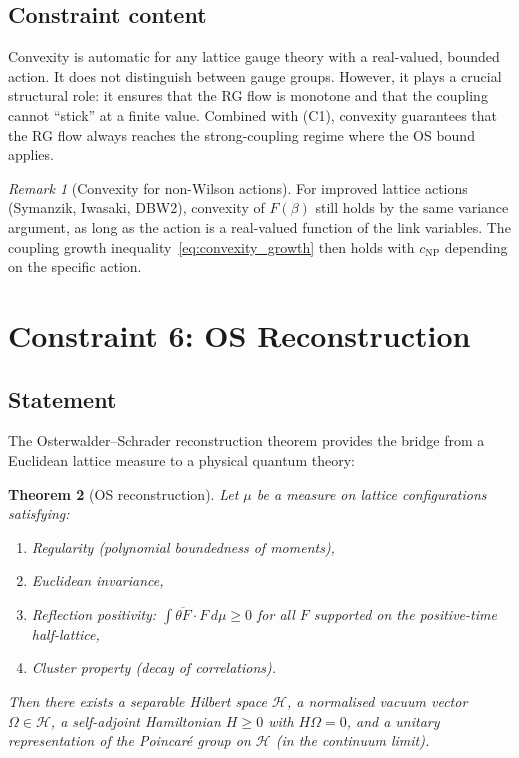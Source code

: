 \documentclass[12pt]{article}
\newtheorem{theorem}{Theorem}[section]
\theoremstyle{definition}
\theoremstyle{remark}
\newtheorem{remark}[theorem]{Remark}
\begin{document}
\subsection{Constraint content}

Convexity is automatic for any lattice gauge theory with a
real-valued, bounded action.  It does not distinguish between
gauge groups.  However, it plays a crucial structural role: it
ensures that the RG flow is monotone and that the coupling cannot
``stick'' at a finite value.  Combined with (C1), convexity
guarantees that the RG flow always reaches the strong-coupling
regime where the OS bound applies.

\begin{remark}[Convexity for non-Wilson actions]
For improved lattice actions (Symanzik, Iwasaki, DBW2), convexity
of $F(\beta)$ still holds by the same variance argument, as long
as the action is a real-valued function of the link variables.
The coupling growth inequality~\eqref{eq:convexity_growth} then
holds with $c_{\mathrm{NP}}$ depending on the specific action.
\end{remark}

\section{Constraint 6: OS Reconstruction}
\label{sec:OS}

\subsection{Statement}

The Osterwalder--Schrader reconstruction theorem
\cite{OS73,OS75} provides the bridge from a Euclidean lattice
measure to a physical quantum theory:

\begin{theorem}[OS reconstruction]
\label{thm:OS}
Let $\mu$ be a measure on lattice configurations satisfying:
\begin{enumerate}[label=\textup{(OS\arabic*)}]
\item Regularity (polynomial boundedness of moments),
\item Euclidean invariance,
\item Reflection positivity:
  $\int \overline{\theta F}\cdot F\,d\mu \geq 0$ for all
  $F$ supported on the positive-time half-lattice,
\item Cluster property (decay of correlations).
\end{enumerate}
Then there exists a separable Hilbert space $\mathcal{H}$,
a normalised vacuum vector $\Omega \in \mathcal{H}$,
a self-adjoint Hamiltonian $H \geq 0$ with $H\Omega = 0$,
and a unitary representation of the Poincar\'e group on
$\mathcal{H}$ (in the continuum limit).
\end{theorem}
\end{document}
